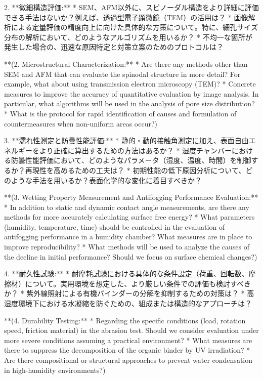 \documentclass{article}
\begin{document}
2.  **微細構造評価:**
    *   SEM、AFM以外に、スピノーダル構造をより詳細に評価できる手法はないか？例えば、透過型電子顕微鏡（TEM）の活用は？
    *   画像解析による定量評価の精度向上に向けた具体的な方策について。特に、細孔サイズ分布の解析において、どのようなアルゴリズムを用いるか？
    *   不均一な箇所が発生した場合の、迅速な原因特定と対策立案のためのプロトコルは？

    **(2. Microstructural Characterization:**
    *   Are there any methods other than SEM and AFM that can evaluate the spinodal structure in more detail? For example, what about using transmission electron microscopy (TEM)?
    *   Concrete measures to improve the accuracy of quantitative evaluation by image analysis. In particular, what algorithms will be used in the analysis of pore size distribution?
    *   What is the protocol for rapid identification of causes and formulation of countermeasures when non-uniform areas occur?)

3.  **濡れ性測定と防曇性能評価:**
    *   静的・動的接触角測定に加え、表面自由エネルギーをより正確に算出するための方法はあるか？
    *   湿度チャンバーにおける防曇性能評価において、どのようなパラメータ（湿度、温度、時間）を制御するか？再現性を高めるための工夫は？
    *   初期性能の低下原因分析について、どのような手法を用いるか？表面化学的な変化に着目すべきか？

    **(3. Wetting Property Measurement and Antifogging Performance Evaluation:**
    *   In addition to static and dynamic contact angle measurements, are there any methods for more accurately calculating surface free energy?
    *   What parameters (humidity, temperature, time) should be controlled in the evaluation of antifogging performance in a humidity chamber? What measures are in place to improve reproducibility?
    *   What methods will be used to analyze the causes of the decline in initial performance? Should we focus on surface chemical changes?)

4.  **耐久性試験:**
    *   耐摩耗試験における具体的な条件設定（荷重、回転数、摩擦材）について。実用環境を想定した、より厳しい条件での評価も検討すべきか？
    *   紫外線照射による有機バインダーの分解を抑制するための対策は？
    *   高湿度環境下における水凝縮を防ぐための、組成または構造的なアプローチは？

    **(4. Durability Testing:**
    *   Regarding the specific conditions (load, rotation speed, friction material) in the abrasion test. Should we consider evaluation under more severe conditions assuming a practical environment?
    *   What measures are there to suppress the decomposition of the organic binder by UV irradiation?
    *   Are there compositional or structural approaches to prevent water condensation in high-humidity environments?)
\end{document}
